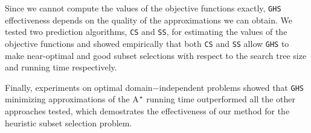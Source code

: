 Since we cannot compute the values of the objective functions exactly, \texttt{GHS} effectiveness depends on the quality of the approximations we can obtain. We tested two prediction algorithms, \texttt{CS} and \texttt{SS}, for estimating the values of the objective functions and showed empirically that both \texttt{CS} and \texttt{SS} allow \texttt{GHS} to make near-optimal and good subset selections with respect to the search tree size and running time respectively.

Finally, experiments on optimal domain$-$independent problems showed that \texttt{GHS} minimizing approximations of the A$\sp{*}$ running time outperformed all the other approaches tested, which demostrates the effectiveness of our method for the heuristic subset selection problem.

\clearpage